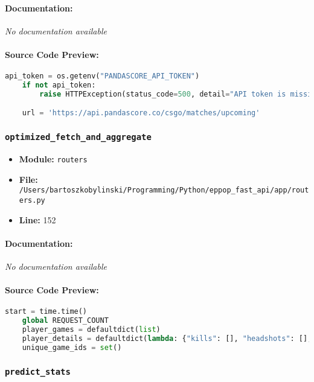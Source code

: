 \documentclass[11pt,a4paper]{article}
\begin{document}
\paragraph{Documentation:} \textit{No documentation available}

\paragraph{Source Code Preview:}
\begin{lstlisting}[language=Python]
    api_token = os.getenv("PANDASCORE_API_TOKEN")
    if not api_token:
        raise HTTPException(status_code=500, detail="API token is missing")

    url = 'https://api.pandascore.co/csgo/matches/upcoming'
\end{lstlisting}

\vspace{1em}
\subsubsection{\texttt{optimized\_fetch\_and\_aggregate}}

\begin{itemize}
    \item \textbf{Module:} \texttt{routers}
    \item \textbf{File:} \texttt{/Users/bartoszkobylinski/Programming/Python/eppop\_fast\_api/app/routers.py}
    \item \textbf{Line:} 152
\end{itemize}

\paragraph{Documentation:} \textit{No documentation available}

\paragraph{Source Code Preview:}
\begin{lstlisting}[language=Python]
    start = time.time()
    global REQUEST_COUNT
    player_games = defaultdict(list)
    player_details = defaultdict(lambda: {"kills": [], "headshots": [], "rounds": []})
    unique_game_ids = set()
\end{lstlisting}

\vspace{1em}
\subsubsection{\texttt{predict\_stats}}
\end{document}
